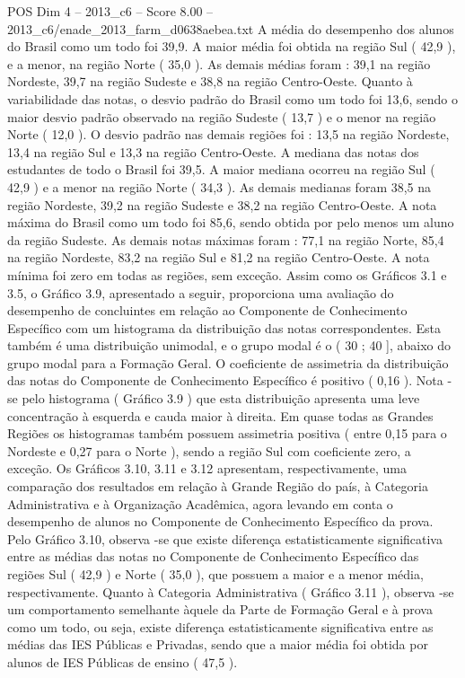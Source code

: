\begin{textsample}{POS Dim 4 – 2013\_c6 – Score 8.00 – 2013\_c6/enade\_2013\_farm\_d0638aebea.txt}
A média do desempenho dos alunos do Brasil como um todo foi 39,9.
A maior média foi obtida na região Sul ( 42,9 ), e a menor, na região Norte ( 35,0 ).
As demais médias foram : 39,1 na região Nordeste, 39,7 na região Sudeste e 38,8 na região Centro-Oeste.
Quanto à variabilidade das notas, o desvio padrão do Brasil como um todo foi 13,6, sendo o maior desvio padrão observado na região Sudeste ( 13,7 ) e o menor na região Norte ( 12,0 ).
O desvio padrão nas demais regiões foi : 13,5 na região Nordeste, 13,4 na região Sul e 13,3 na região Centro-Oeste.
A mediana das notas dos estudantes de todo o Brasil foi 39,5.
A maior mediana ocorreu na região Sul ( 42,9 ) e a menor na região Norte ( 34,3 ).
As demais medianas foram 38,5 na região Nordeste, 39,2 na região Sudeste e 38,2 na região Centro-Oeste.
A nota máxima do Brasil como um todo foi 85,6, sendo obtida por pelo menos um aluno da região Sudeste.
As demais notas máximas foram : 77,1 na região Norte, 85,4 na região Nordeste, 83,2 na região Sul e 81,2 na região Centro-Oeste.
A nota mínima foi zero em todas as regiões, sem exceção.
Assim como os Gráficos 3.1 e 3.5, o Gráfico 3.9, apresentado a seguir, proporciona uma avaliação do desempenho de concluintes em relação ao Componente de Conhecimento Específico com um histograma da distribuição das notas correspondentes.
Esta também é uma distribuição unimodal, e o grupo modal é o ( 30 ; 40 ], abaixo do grupo modal para a Formação Geral.
O coeficiente de assimetria da distribuição das notas do Componente de Conhecimento Específico é positivo ( 0,16 ).
Nota -se pelo histograma ( Gráfico 3.9 ) que esta distribuição apresenta uma leve concentração à esquerda e cauda maior à direita.
Em quase todas as Grandes Regiões os histogramas também possuem assimetria positiva ( entre 0,15 para o Nordeste e 0,27 para o Norte ), sendo a região Sul com coeficiente zero, a exceção.
Os Gráficos 3.10, 3.11 e 3.12 apresentam, respectivamente, uma comparação dos resultados em relação à Grande Região do país, à Categoria Administrativa e à Organização Acadêmica, agora levando em conta o desempenho de alunos no Componente de Conhecimento Específico da prova.
Pelo Gráfico 3.10, observa -se que existe diferença estatisticamente significativa entre as médias das notas no Componente de Conhecimento Específico das regiões Sul ( 42,9 ) e Norte ( 35,0 ), que possuem a maior e a menor média, respectivamente.
Quanto à Categoria Administrativa ( Gráfico 3.11 ), observa -se um comportamento semelhante àquele da Parte de Formação Geral e à prova como um todo, ou seja, existe diferença estatisticamente significativa entre as médias das IES Públicas e Privadas, sendo que a maior média foi obtida por alunos de IES Públicas de ensino ( 47,5 ).

\end{textsample}
